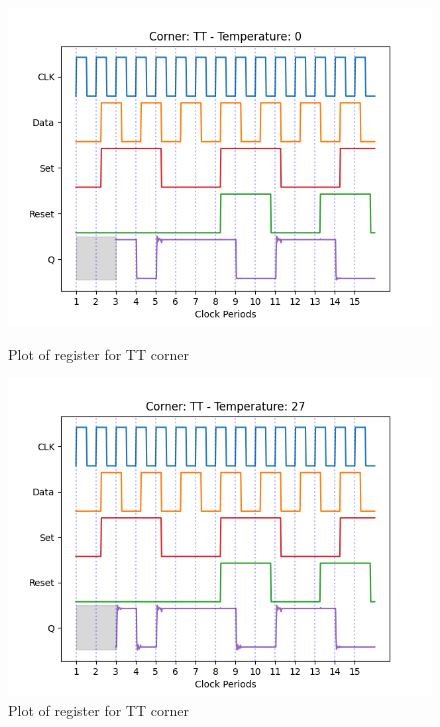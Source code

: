 \begin{figure}[H]
    \begin{minipage}{0.5\textwidth}
        \centering
        \includegraphics[width=\textwidth]{Figures/Aimspice_Plots/TT_0.png}
        \caption{Plot of register for TT corner}
        \label{fig:TT0}
    \end{minipage}%
    \begin{minipage}{0.5\textwidth}
        \centering
        \includegraphics[width=\textwidth]{Figures/Aimspice_Plots/TT_27.png}
        \caption{Plot of register for TT corner}
        \label{fig:TT27}
    \end{minipage}
\end{figure}
